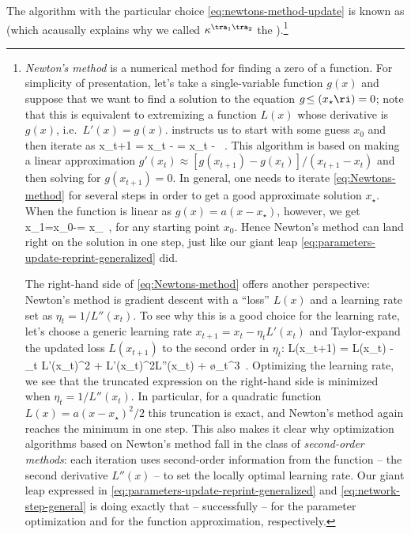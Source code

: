 The algorithm with the particular choice \eqref{eq:newtons-method-update} is known as  (which acausally explains why we called $\kappa^{\tra_1 \tra_2}$ the ).\footnote{\emph{Newton's method}\label{footnote:newtons-method} is a numerical method for finding a zero of a function. For simplicity of presentation, let's take a single-variable function $g(x)$ and suppose that we want to find a solution to the equation $g\!\le(x_\star\ri)=0$; note that this is equivalent to extremizing a function $L(x)$ whose derivative is $g(x)$, i.e.~$L'(x)=g(x)$.
 instructs us to start with some guess $x_{0}$ and then iterate as
    \be\label{eq:Newtons-method}
       x_{t+1} = x_{t} - = x_{t} - \, .
    \ee 
This algorithm is based on making a linear approximation $g'(x_{t})\approx [g(x_{t+1})-g(x_{t})]/(x_{t+1}-x_{t})$ and then solving for $g(x_{t+1})=0$.
In general, one needs to iterate \eqref{eq:Newtons-method} for several steps in order to get a good approximate solution $x_{\star}$.
When the function is linear as $g(x)=a (x-x_{\star})$, however, we get
 \be
 x_{1}=x_0-= x_{\star}\, ,
 \ee
for any starting point $x_0$.
Hence Newton's method can land right on the solution in one step, just like our giant leap \eqref{eq:parameters-update-reprint-generalized} did.

The right-hand side of \eqref{eq:Newtons-method} offers another perspective: Newton's method is gradient descent with a ``loss'' $L(x)$ and a learning rate set as $\eta_t=1/L''(x_{t})$. To see why this is a good choice for the learning rate, let's choose a generic learning rate $x_{t+1}=x_t-\eta_t L'(x_t)$ and Taylor-expand the updated loss $L(x_{t+1})$ to the second order in $\eta_t$:
\be
L\!\le(x_{t+1}\ri) = L\!\le(x_{t}\ri) - \eta_t L'\!\le(x_{t}\ri)^2 +  L'\!\le(x_{t}\ri)^2L''\!\le(x_{t}\ri)  + \o{\eta_t^3}\, .
\ee
Optimizing the learning rate, we see that the truncated expression on the right-hand side is minimized when $\eta_t=1/L''(x_{t})$. In particular, for a quadratic function $L(x)=a(x-x_{\star})^2/2$ this truncation is exact, and Newton's method again reaches the minimum in one step.
This also makes it clear why optimization algorithms based on Newton's method fall in the class of \emph{second-order methods}: each iteration uses second-order information from the function -- the second derivative $L''(x)$ -- to set the locally optimal learning rate. 
Our giant leap expressed in \eqref{eq:parameters-update-reprint-generalized} and \eqref{eq:network-step-general} is doing exactly that -- successfully -- for the parameter optimization and for the function approximation, respectively.
}
